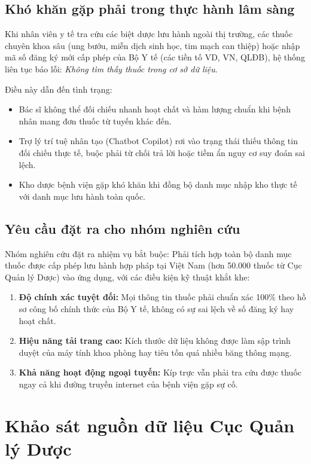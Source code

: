 \documentclass[12pt,a4paper]{article}
\begin{document}
\subsection{Khó khăn gặp phải trong thực hành lâm sàng}
Khi nhân viên y tế tra cứu các biệt dược lưu hành ngoài thị trường, các thuốc chuyên khoa sâu (ung bướu, miễn dịch sinh học, tim mạch can thiệp) hoặc nhập mã số đăng ký mới cấp phép của Bộ Y tế (các tiền tố VD, VN, QLĐB), hệ thống liên tục báo lỗi: \textit{Không tìm thấy thuốc trong cơ sở dữ liệu}. 

Điều này dẫn đến tình trạng:
\begin{itemize}[leftmargin=1.5em]
    \item Bác sĩ không thể đối chiếu nhanh hoạt chất và hàm lượng chuẩn khi bệnh nhân mang đơn thuốc từ tuyến khác đến.
    \item Trợ lý trí tuệ nhân tạo (Chatbot Copilot) rơi vào trạng thái thiếu thông tin đối chiếu thực tế, buộc phải từ chối trả lời hoặc tiềm ẩn nguy cơ suy đoán sai lệch.
    \item Kho dược bệnh viện gặp khó khăn khi đồng bộ danh mục nhập kho thực tế với danh mục lưu hành toàn quốc.
\end{itemize}

\subsection{Yêu cầu đặt ra cho nhóm nghiên cứu}
Nhóm nghiên cứu đặt ra nhiệm vụ bắt buộc: Phải tích hợp toàn bộ danh mục thuốc được cấp phép lưu hành hợp pháp tại Việt Nam (hơn 50.000 thuốc từ Cục Quản lý Dược) vào ứng dụng, với các điều kiện kỹ thuật khắt khe:
\begin{enumerate}[leftmargin=1.5em]
    \item \textbf{Độ chính xác tuyệt đối:} Mọi thông tin thuốc phải chuẩn xác 100\% theo hồ sơ công bố chính thức của Bộ Y tế, không có sự sai lệch về số đăng ký hay hoạt chất.
    \item \textbf{Hiệu năng tải trang cao:} Kích thước dữ liệu không được làm sập trình duyệt của máy tính khoa phòng hay tiêu tốn quá nhiều băng thông mạng.
    \item \textbf{Khả năng hoạt động ngoại tuyến:} Kíp trực vẫn phải tra cứu được thuốc ngay cả khi đường truyền internet của bệnh viện gặp sự cố.
\end{enumerate}

\section{Khảo sát nguồn dữ liệu Cục Quản lý Dược}
\end{document}
